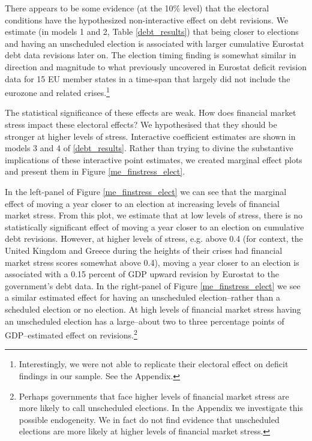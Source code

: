 \documentclass[]{article}
\begin{document}
There appears to be some evidence (at the 10\% level) that the electoral conditions have the hypothesized non-interactive effect on debt revisions. We estimate (in models 1 and 2, Table \ref{debt_results}) that being closer to elections and having an unscheduled election is associated with larger cumulative Eurostat debt data revisions later on. The election timing finding is somewhat similar in direction and magnitude to what \cite{DeCastro2013} previously uncovered in Eurostat deficit revision data for 15 EU member states in a time-span that largely did not include the eurozone and related crises.\footnote{Interestingly, we were not able to replicate their electoral effect on deficit findings in our sample. See the Appendix.}

The statistical significance of these effects are weak. How does financial market stress impact these electoral effects? We hypothesised that they should be stronger at higher levels of stress. Interactive coefficient estimates are shown in models 3 and 4 of \ref{debt_results}. Rather than trying to divine the substantive implications of these interactive point estimates, we created marginal effect plots and present them in Figure \ref{me_finstress_elect}.

In the left-panel of Figure \ref{me_finstress_elect} we can see that the marginal effect of moving a year closer to an election at increasing levels of financial market stress. From this plot, we estimate that at low levels of stress, there is no statistically significant effect of moving a year closer to an election on cumulative debt revisions. However, at higher levels of stress, e.g. above 0.4 (for context, the United Kingdom and Greece during the heights of their crises had financial market stress scores somewhat above 0.4), moving a year closer to an election is associated with a 0.15 percent of GDP upward revision by Eurostat to the government's debt data. In the right-panel of Figure \ref{me_finstress_elect} we see a similar estimated effect for having an unscheduled election--rather than a scheduled election or no election. At high levels of financial market stress having an unscheduled election has a large--about two to three percentage points of GDP--estimated effect on revisions.\footnote{Perhaps governments that face higher levels of financial market stress are more likely to call unscheduled elections. In the Appendix we investigate this possible endogeneity. We in fact do not find evidence that unscheduled elections are more likely at higher levels of financial market stress.}
\end{document}
